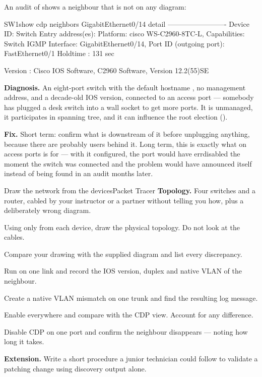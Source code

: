 \begin{breakfix}
An audit of  shows a neighbour that is not on any diagram:

\begin{verify}{SW1}{show cdp neighbors GigabitEthernet0/14 detail}
-------------------------
Device ID: Switch
Entry address(es):
Platform: cisco WS-C2960-8TC-L,  Capabilities: Switch IGMP
Interface: GigabitEthernet0/14,  Port ID (outgoing port): FastEthernet0/1
Holdtime : 131 sec

Version :
Cisco IOS Software, C2960 Software, Version 12.2(55)SE
\end{verify}

\textbf{Diagnosis.} An eight-port switch with the default hostname ,
no management address, and a decade-old IOS version, connected to an access port
--- somebody has plugged a desk switch into a wall socket to get more ports. It is
unmanaged, it participates in spanning tree, and it can influence the root
election ().

\textbf{Fix.} Short term: confirm what is downstream of it before unplugging
anything, because there are probably users behind it. Long term, this is exactly
what  on access ports is for --- with it configured,
the port would have errdisabled the moment the switch was connected and the
problem would have announced itself instead of being found in an audit months
later.
\end{breakfix}

\begin{lab}{Draw the network from the devices}{Packet Tracer}
\textbf{Topology.} Four switches and a router, cabled by your instructor or a
partner without telling you how, plus a deliberately wrong diagram.

\begin{tasks}
  \item Using only  from each device, draw the physical
        topology. Do not look at the cables.
  \item Compare your drawing with the supplied diagram and list every
        discrepancy.
  \item Run  on one link and record the IOS
        version, duplex and native VLAN of the neighbour.
  \item Create a native VLAN mismatch on one trunk and find the resulting log
        message.
  \item Enable  everywhere and compare 
        with the CDP view. Account for any difference.
  \item Disable CDP on one port and confirm the neighbour disappears --- noting
        how long it takes.
  \item \textbf{Extension.} Write a short procedure a junior technician could
        follow to validate a patching change using discovery output alone.
\end{tasks}
\end{lab}

